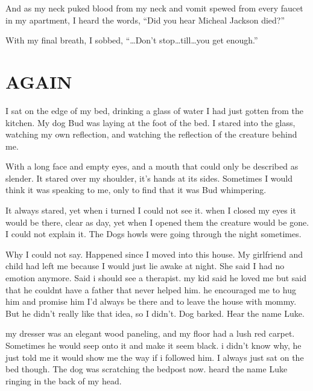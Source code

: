 And as my neck puked blood from my neck and vomit spewed from every
faucet in my apartment, I heard the words, ``Did you hear Micheal
Jackson died?''



With my final breath, I sobbed, ``{\ldots}Don't stop{\ldots}till{\ldots}you get
enough.'' 
 





\chapter{AGAIN}



I sat on the edge of my bed, drinking a glass of water I had just
gotten from the kitchen. My dog Bud was laying at the foot of the
bed. I stared into the glass, watching my own reflection, and
watching the reflection of the creature behind me.



With a long face and empty eyes, and a mouth that could only be
described as slender. It stared over my shoulder, it's hands at its
sides. Sometimes I would think it was speaking to me, only to find
that it was Bud whimpering.



It always stared, yet when i turned I could not see it. when I
closed my eyes it would be there, clear as day, yet when I opened
them the creature would be gone. I could not explain it. The Dogs
howls were going through the night sometimes.



Why I could not say. Happened since I moved into this house. My
girlfriend and child had left me because I would just lie awake at
night. She said I had no emotion anymore. Said i should see a
therapist. my kid said he loved me but said that he couldnt have a
father that never helped him. he encouraged me to hug him and
promise him I'd always be there and to leave the house with mommy.
But he didn't really like that idea, so I didn't. Dog barked. Hear
the name Luke.



my dresser was an elegant wood paneling, and my floor had a lush
red carpet. Sometimes he would seep onto it and make it seem black.
i didn't know why, he just told me it would show me the way if i
followed him. I always just sat on the bed though. The dog was
scratching the bedpost now. heard the name Luke ringing in the back
of my head.



